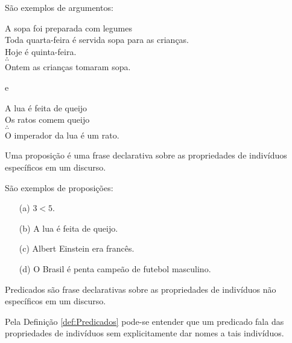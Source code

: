 \begin{example}\label{exe:Argumento}
    São exemplos de argumentos:
    
		\begin{center}
			A sopa foi preparada  com legumes\\ 
			Toda quarta-feira é servida sopa para as crianças.\\
			Hoje é quinta-feira.\\
			$\therefore$\\
			Ontem as crianças tomaram sopa.
		\end{center}
	
		e
		
		\begin{center}
			A lua é feita de queijo\\
			Os ratos comem queijo\\ 
			$\therefore$\\
			O imperador da lua é um rato.
		\end{center}
\end{example}

\begin{definition}[Proposição]\label{def:Proposicao}
	Uma proposição é uma frase declarativa sobre as propriedades de indivíduos específicos em um discurso.
\end{definition}

\begin{example}\label{exe:Proposicoes}
    São exemplos de proposições:
	\begin{itemize}
		\item[(a)] $3 < 5$.
		\item[(b)] A lua é feita de queijo.
		\item[(c)] Albert Einstein era francês.
		\item[(d)] O Brasil é penta campeão de futebol masculino.
	\end{itemize}
\end{example}

\begin{definition}[Predicados]\label{def:Predicados}
	Predicados são frase declarativas sobre as propriedades de indivíduos não específicos em um discurso.
\end{definition}

Pela Definição \ref{def:Predicados} pode-se entender que um predicado fala das propriedades de indivíduos sem explicitamente dar nomes a tais indivíduos.

